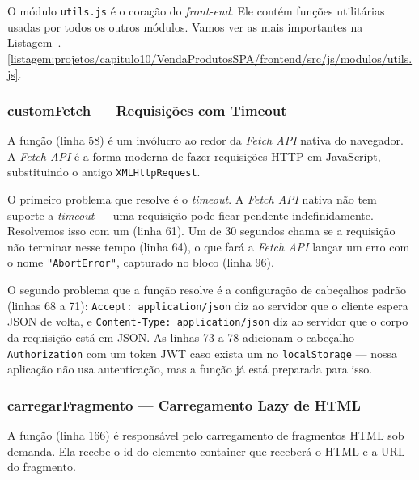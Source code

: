 O módulo \texttt{utils.js} é o coração do \textit{front-end}. Ele contém funções utilitárias usadas por todos os outros módulos. Vamos ver as mais importantes na Listagem~\thechapter.\ref{listagem:projetos/capitulo10/VendaProdutosSPA/frontend/src/js/modulos/utils.js}.


\subsubsection{customFetch --- Requisições com Timeout}

A função  (linha 58) é um invólucro ao redor da \textit{Fetch API} nativa do navegador. A \textit{Fetch API} é a forma moderna de fazer requisições HTTP em JavaScript, substituindo o antigo \texttt{XMLHttpRequest}.

O primeiro problema que  resolve é o \textit{timeout}. A \textit{Fetch API} nativa não tem suporte a \textit{timeout} --- uma requisição pode ficar pendente indefinidamente. Resolvemos isso com um  (linha 61). Um  de 30 segundos chama  se a requisição não terminar nesse tempo (linha 64), o que fará a \textit{Fetch API} lançar um erro com o nome \texttt{"AbortError"}, capturado no bloco  (linha 96).

O segundo problema que a função resolve é a configuração de cabeçalhos padrão (linhas 68 a 71): \texttt{Accept: application/json} diz ao servidor que o cliente espera JSON de volta, e \texttt{Content-Type: application/json} diz ao servidor que o corpo da requisição está em JSON. As linhas 73 a 78 adicionam o cabeçalho \texttt{Authorization} com um token JWT caso exista um no \texttt{localStorage} --- nossa aplicação não usa autenticação, mas a função já está preparada para isso.

\subsubsection{carregarFragmento --- Carregamento Lazy de HTML}

A função  (linha 166) é responsável pelo carregamento de fragmentos HTML sob demanda. Ela recebe o id do elemento container que receberá o HTML e a URL do fragmento.

